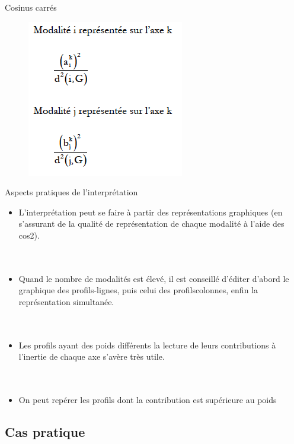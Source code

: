 \documentclass[10pt]{beamer}
\begin{document}
\begin{frame}{Cosinus carrés}
\begin{figure}
\includegraphics[scale=0.6]{exemple17.png}  
\end{figure}

\end{frame}



\begin{frame}{Aspects pratiques de l’interprétation}

\begin{itemize}
\item L’interprétation peut se faire à partir des représentations graphiques (en s’assurant de la qualité de représentation de chaque modalité à
l’aide des cos2).\\~\\~\\
\item Quand le nombre de modalités est élevé, il est conseillé d’éditer d’abord le graphique des profils-lignes, puis celui des profilscolonnes, enfin la représentation simultanée.\\~\\~\\

\item Les profils ayant des poids différents la lecture de leurs
contributions à l’inertie de chaque axe s’avère très utile.\\~\\~\\

\item On peut repérer les profils dont la contribution est supérieure au poids
\end{itemize}
\end{frame}

\subsection{Cas pratique}
\end{document}
